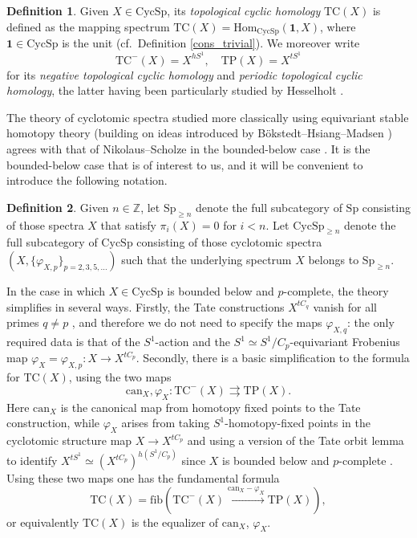 \documentclass{amsart}
\newcommand{\can}{\mathrm{can}}
\newcommand{\TP}{\mathrm{TP}}
\renewcommand{\hom}{\mathrm{Hom}}
\newcommand{\Sp}{\mathrm{Sp}}
\theoremstyle{definition}
\newtheorem{definition}{Definition}[section]
\newcommand{\CycSp}{\mathrm{CycSp}}
\newcommand{\TC}{\mathrm{TC}}
\begin{document}
\begin{definition}\label{definition_TC_via_NS}
Given $X \in \CycSp$, its \emph{topological cyclic homology} $\TC(X) $ is
defined as the mapping spectrum $\TC(X) = \hom_{\CycSp}(\mathbf{1}, X)$, where
$\mathbf{1} \in \CycSp$ is the unit (cf.~Definition \ref{cons_trivial}). We moreover write \[ \TC^-(X) = X^{hS^1}, \quad \TP(X) = X^{tS^1}\] for its {\em negative topological cyclic homology} and \emph{periodic topological cyclic homology}, the latter having been particularly studied by Hesselholt \cite{hesselholt-tp}. 
\end{definition} 

The theory of cyclotomic spectra  studied more classically using equivariant stable homotopy theory \cite{BMcyc} (building on ideas introduced by B\"okstedt--Hsiang--Madsen \cite{BHM}) agrees with that of Nikolaus--Scholze in the bounded-below case \cite[Thm.~II.6.9]{nikolaus-scholze}. It is the bounded-below case that is of interest to us, and it will be convenient to introduce the following notation. 

\begin{definition} 
Given $n \in \mathbb{Z}$, let 
$\Sp_{\geq n}$ denote the full subcategory of $\Sp$ consisting 
of those spectra $X$ that satisfy 
$\pi_i(X) = 0$ for $i < n$. 
Let
$\CycSp_{\geq n}$ denote the full subcategory
of $\CycSp$ consisting of those cyclotomic spectra $(X,
\{\varphi_{X,p}\}_{p = 2, 3, 5, \dots} )$ such that the underlying
spectrum $X$ belongs to $\Sp_{\geq n}$.
\end{definition}

In the case in which $X\in \CycSp$ is bounded below and $p$-complete, the theory simplifies in several ways. Firstly, the Tate constructions $X^{tC_q}$ vanish for all primes $q\neq p$ \cite[Lem.~I.2.9]{nikolaus-scholze}, and therefore we do not need to specify the maps $\varphi_{X, q}$: the only required data is that of the $S^1$-action and the $S^1\simeq S^1/C_p$-equivariant Frobenius map $\varphi_X = \varphi_{X,p}: X \to X^{tC_p}$. Secondly, there is a basic simplification to the
formula for $\TC(X)$, using the two maps
\[ \can_X, \varphi_X :  \TC^-(X) \rightrightarrows  \TP(X).\]
Here $\can_X$ is the canonical map from homotopy fixed points to the Tate
construction, while $\varphi_X$ arises from taking $S^1$-homotopy-fixed points
in the cyclotomic structure map $X \to X^{tC_p}$ and using a version of the Tate orbit lemma
to identify 
$X^{tS^1} \simeq (X^{tC_p})^{h(S^1/C_p)}$ since $X$ is bounded below and $p$-complete \cite[Lem.~II.4.2]{nikolaus-scholze}. Using these two maps one has the fundamental formula
\cite[Prop II.1.9]{nikolaus-scholze} 
\begin{equation} \label{keyformula} \TC(X) = \mathrm{fib}( \TC^-(X)
\xrightarrow{\can_X - \varphi_X} \TP(X)),\end{equation}
or equivalently $\TC(X)$ is the equalizer of $\mathrm{can}_X$,
$\varphi_X$. 
\end{document}
